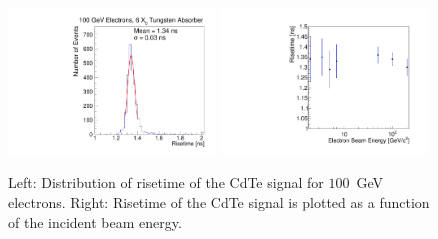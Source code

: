 \begin{figure}[htbp] 
\centering
\includegraphics[width=0.49\textwidth]{figures/100GeV_risetime.pdf} 
\includegraphics[width=0.49\textwidth]{figures/RisetimeVsEnergy.pdf} 
\caption{ Left: Distribution of risetime of the CdTe signal for $100$~GeV electrons. 
Right: Risetime of the CdTe signal is plotted as a function of the incident beam energy. } 
\label{fig:riseTime} 
\end{figure} 



